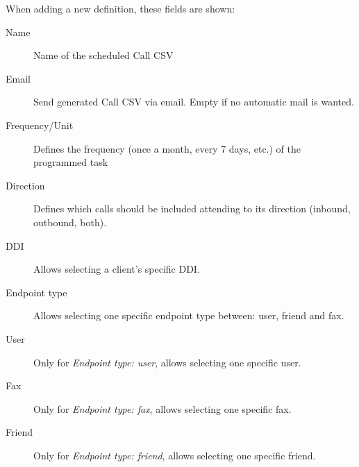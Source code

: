 \documentclass[letterpaper,10pt,english]{sphinxmanual}
\begin{document}
When adding a new definition, these fields are shown:
\begin{description}
\item[{Name}] \leavevmode{}\label{administration_portal/client/vpbx/calls/call_csv_schedulers:term-name}
Name of the scheduled Call CSV

\item[{Email}] \leavevmode{}\label{administration_portal/client/vpbx/calls/call_csv_schedulers:term-email}
Send generated Call CSV via email. Empty if no automatic mail is wanted.

\item[{Frequency/Unit}] \leavevmode{}\label{administration_portal/client/vpbx/calls/call_csv_schedulers:term-frequency-unit}
Defines the frequency (once a month, every 7 days, etc.) of the programmed task

\item[{Direction}] \leavevmode{}\label{administration_portal/client/vpbx/calls/call_csv_schedulers:term-direction}
Defines which calls should be included attending to its direction (inbound, outbound, both).

\item[{DDI}] \leavevmode{}\label{administration_portal/client/vpbx/calls/call_csv_schedulers:term-ddi}
Allows selecting a client's specific DDI.

\item[{Endpoint type}] \leavevmode{}\label{administration_portal/client/vpbx/calls/call_csv_schedulers:term-endpoint-type}
Allows selecting one specific endpoint type between: user, friend and fax.

\item[{User}] \leavevmode{}\label{administration_portal/client/vpbx/calls/call_csv_schedulers:term-user}
Only for \emph{Endpoint type: user}, allows selecting one specific user.

\item[{Fax}] \leavevmode{}\label{administration_portal/client/vpbx/calls/call_csv_schedulers:term-fax}
Only for \emph{Endpoint type: fax}, allows selecting one specific fax.

\item[{Friend}] \leavevmode{}\label{administration_portal/client/vpbx/calls/call_csv_schedulers:term-friend}
Only for \emph{Endpoint type: friend}, allows selecting one specific friend.

\end{description}
\end{document}
